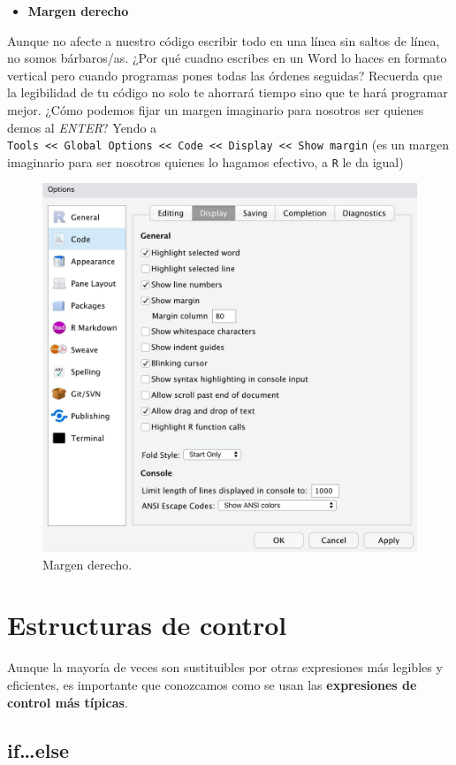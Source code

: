 \documentclass[11pt,]{book}
\providecommand{\tightlist}{%
  \setlength{\itemsep}{0pt}\setlength{\parskip}{0pt}}
\begin{document}
\begin{itemize}
\tightlist
\item
  \textbf{Margen derecho}
\end{itemize}

Aunque no afecte a nuestro código escribir todo en una línea sin saltos de línea, no somos bárbaros/as. ¿Por qué cuadno escribes en un Word lo haces en formato vertical pero cuando programas pones todas las órdenes seguidas? Recuerda que la legibilidad de tu código no solo te ahorrará tiempo sino que te hará programar mejor. ¿Cómo podemos fijar un margen imaginario para nosotros ser quienes demos al \emph{ENTER}? Yendo a \texttt{Tools\ \textless{}\textless{}\ Global\ Options\ \textless{}\textless{}\ Code\ \textless{}\textless{}\ Display\ \textless{}\textless{}\ Show\ margin} (es un margen imaginario para ser nosotros quienes lo hagamos efectivo, a \texttt{R} le da igual)

\begin{figure}

{\centering \includegraphics[width=0.5\linewidth]{./img/show_margin} 

}

\caption{Margen derecho.}\label{fig:show-margin}
\end{figure}

\hypertarget{control}{%
\chapter{Estructuras de control}\label{control}}

Aunque la mayoría de veces son sustituibles por otras expresiones más legibles y eficientes, es importante que conozcamos como se usan las \textbf{expresiones de control más típicas}.

\hypertarget{ifelse}{%
\section{if\ldots{}else}\label{ifelse}}
\end{document}
